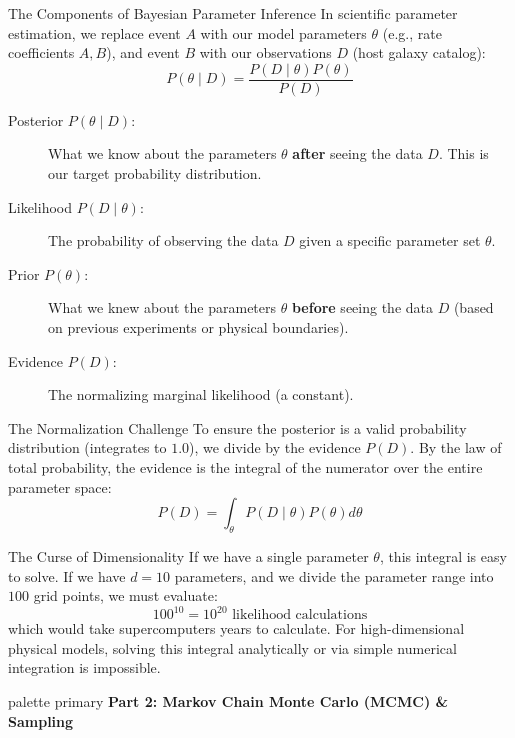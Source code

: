 \documentclass[9pt]{beamer}
\begin{document}
\begin{frame}{The Components of Bayesian Parameter Inference}
  In scientific parameter estimation, we replace event $A$ with our model parameters $\theta$ (e.g., rate coefficients $A, B$), and event $B$ with our observations $D$ (host galaxy catalog):
  $$P(\theta \mid D) = \frac{P(D \mid \theta) P(\theta)}{P(D)}$$
  \begin{description}
    \item[Posterior $P(\theta \mid D)$:] What we know about the parameters $\theta$ \textbf{after} seeing the data $D$. This is our target probability distribution.
    \item[Likelihood $P(D \mid \theta)$:] The probability of observing the data $D$ given a specific parameter set $\theta$.
    \item[Prior $P(\theta)$:] What we knew about the parameters $\theta$ \textbf{before} seeing the data $D$ (based on previous experiments or physical boundaries).
    \item[Evidence $P(D)$:] The normalizing marginal likelihood (a constant).
  \end{description}
\end{frame}

\begin{frame}{The Normalization Challenge}
  To ensure the posterior is a valid probability distribution (integrates to $1.0$), we divide by the evidence $P(D)$. By the law of total probability, the evidence is the integral of the numerator over the entire parameter space:
  $$P(D) = \int_{\theta} P(D \mid \theta) P(\theta) d\theta$$
  \begin{alertblock}{The Curse of Dimensionality}
    If we have a single parameter $\theta$, this integral is easy to solve. If we have $d=10$ parameters, and we divide the parameter range into $100$ grid points, we must evaluate:
    $$100^{10} = 10^{20} \text{ likelihood calculations}$$
    which would take supercomputers years to calculate. For high-dimensional physical models, solving this integral analytically or via simple numerical integration is impossible.
  \end{alertblock}
\end{frame}

\begin{frame}[plain]
  \vfill
  \centering
  \begin{beamercolorbox}[sep=8pt,center,shadow=true,rounded=true]{palette primary}
    \textbf{Part 2: Markov Chain Monte Carlo (MCMC) \& Sampling}
  \end{beamercolorbox}
  \vfill
\end{frame}
\end{document}
